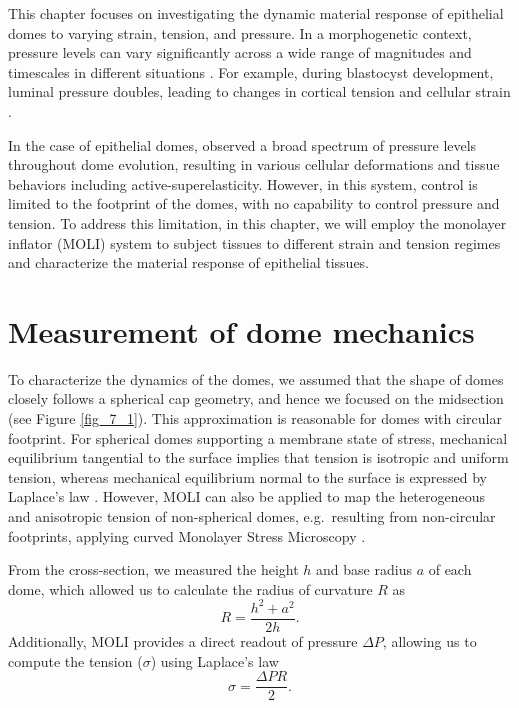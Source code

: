 This chapter focuses on investigating the dynamic material response of epithelial domes to varying strain, tension, and pressure. In a morphogenetic context, pressure levels can vary significantly across a wide range of magnitudes and timescales in different situations \cite{torres-sanchez2021, choudhury2022a}. For example, during blastocyst development, luminal pressure doubles, leading to changes in cortical tension and cellular strain \cite{chan2019}.

In the case of epithelial domes, \citet{latorre2018} observed a broad spectrum of pressure levels throughout dome evolution, resulting in various cellular deformations and tissue behaviors including active-superelasticity. However, in this system, control is limited to the footprint of the domes, with no capability to control pressure and tension. To address this limitation, in this chapter, we will employ the monolayer inflator (MOLI) system to subject tissues to different strain and tension regimes and characterize the material response of epithelial tissues.

\hypertarget{measurement-of-dome-mechanics}{%
	\section{Measurement of dome mechanics}\label{measurement-of-dome-mechanics}}

To characterize the dynamics of the domes, we assumed that the shape of domes closely follows a spherical cap geometry, and hence we focused on the midsection (see Figure \ref{fig_7_1}). This  approximation is reasonable for domes with circular footprint. For spherical domes  supporting a membrane state of stress, mechanical equilibrium tangential to the surface implies that tension is isotropic and uniform tension, whereas mechanical equilibrium normal to the surface is expressed by Laplace's law \cite{latorre2018}. However, MOLI can also be applied to map the  heterogeneous and anisotropic tension of non-spherical domes, e.g.~resulting from non-circular footprints, applying curved Monolayer Stress Microscopy \cite{marin-llaurado2022}.

From the cross-section, we measured the height $h$ and base radius $a$ of each dome, which allowed us to calculate the radius of curvature $R$ as
\begin{equation}
	\label{eqn:radiuscurve}
	R = \frac{h^2 + a^2}{2h}.
\end{equation}
Additionally, MOLI provides a direct readout of pressure $\Delta P$, allowing us to compute the tension ($\sigma$) using Laplace's law
\begin{equation}
	\label{eqn:laplace}
	\sigma = \frac{\Delta PR }{2} .
\end{equation}

